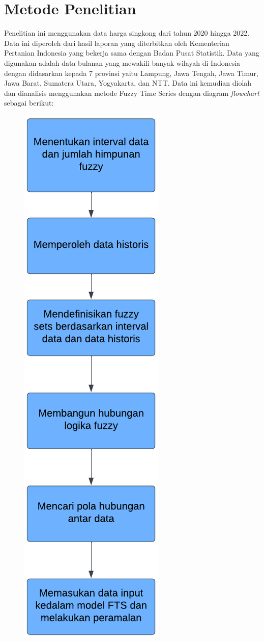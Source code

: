 \documentclass[conference]{IEEEtran}
\begin{document}
\section{Metode Penelitian}

Penelitian ini menggunakan data harga singkong dari tahun 2020 hingga 2022. Data ini diperoleh dari hasil laporan yang diterbitkan oleh Kementerian Pertanian Indonesia yang bekerja sama dengan Badan Pusat Statistik. Data yang digunakan adalah data bulanan yang mewakili banyak wilayah di Indonesia dengan didasarkan kepada 7 provinsi yaitu Lampung, Jawa Tengah, Jawa Timur, Jawa Barat, Sumatera Utara, Yogyakarta, dan NTT. Data ini kemudian diolah dan dianalisis menggunakan metode Fuzzy Time Series dengan diagram \textit{flowchart} sebagai berikut:

\begin{figure}[htbp]
    \centering
    {\includegraphics[scale=0.7]{flowchart.png}} 

\end{figure}
\end{document}
